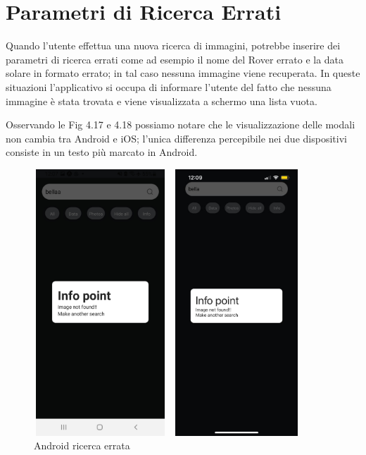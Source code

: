 \section{Parametri di Ricerca Errati}
Quando l'utente effettua una nuova ricerca di immagini, potrebbe inserire dei parametri di ricerca errati come ad esempio il nome del Rover errato e la data solare in formato errato;
in tal caso nessuna immagine viene recuperata. In queste situazioni l'applicativo si occupa di informare l'utente del fatto che nessuna immagine \`e
stata trovata e viene visualizzata a schermo una lista vuota.

Osservando le Fig 4.17 e 4.18 possiamo notare che le visualizzazione delle modali non cambia tra Android e iOS; l'unica differenza percepibile nei due dispositivi consiste in un testo pi\`u marcato in Android.
\begin{figure}[h]
    \begin{minipage}[h]{0.47\textwidth}
        \centering
        \includegraphics[width=5cm, height=10cm]{images/immaginiAndroid/ricercaErrata.jpg}
        \caption{\label{ricercaErrataAndroid} Android ricerca errata}
    \end{minipage}
    \hfill
    \begin{minipage}[h]{0.47\textwidth}
        \centering
        \includegraphics[width=5cm, height=10cm]{images/immaginiPhone/ricercaErrata.jpeg}

\end{minipage}
\end{figure}
